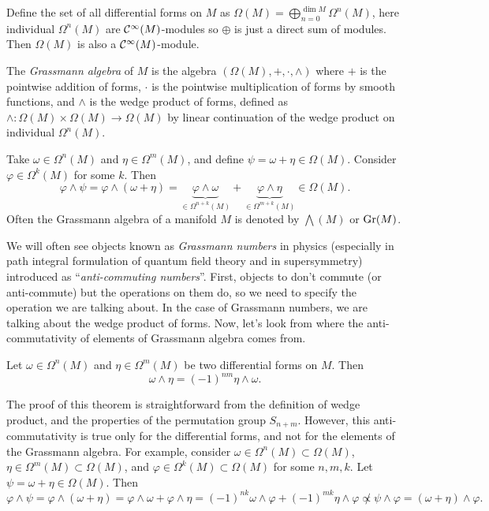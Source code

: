 Define the set of all differential forms on \(M\) as \(\Omega(M) = \bigoplus_{n=0}^{\dim M} \Omega^n(M)\), here individual \(\Omega^n(M)\) are \(\mathcal C^\infty(M)\)-modules so \(\oplus\) is just a direct sum of modules. Then \(\Omega(M)\) is also a \(\mathcal C^\infty(M)\)-module.
\begin{definition}
    The \emph{Grassmann algebra} of \(M\) is the algebra \((\Omega(M), +, \cdot, \wedge)\) where \(+\) is the pointwise addition of forms, \(\cdot\) is the pointwise multiplication of forms by smooth functions, and \(\wedge\) is the wedge product of forms, defined as \(\wedge: \Omega(M) \times \Omega(M) \to \Omega(M)\) by linear continuation of the wedge product on individual \(\Omega^n(M)\).
\end{definition}
Take \(\omega \in \Omega^n(M)\) and \(\eta \in \Omega^m(M)\), and define \(\psi = \omega + \eta \in \Omega(M)\). Consider \(\varphi \in \Omega^k(M)\) for some \(k\). Then
\begin{equation*}
    \varphi \wedge \psi = \varphi \wedge (\omega + \eta) = \underbrace{\varphi \wedge \omega}_{\in \Omega^{n+k}(M)} + \underbrace{\varphi \wedge \eta}_{\in \Omega^{m+k}(M)} \in \Omega(M).
\end{equation*}
Often the Grassmann algebra of a manifold \(M\) is denoted by \(\bigwedge(M)\) or \(\operatorname{Gr}(M)\).

We will often see objects known as \emph{Grassmann numbers} in physics (especially in path integral formulation of quantum field theory and in supersymmetry) introduced as ``\emph{anti-commuting numbers}''. First, objects to don't commute (or anti-commute) but the operations on them do, so we need to specify the operation we are talking about. In the case of Grassmann numbers, we are talking about the wedge product of forms. Now, let's look from where the anti-commutativity of elements of Grassmann algebra comes from.
\begin{theorem}
    Let \(\omega \in \Omega^n(M)\) and \(\eta \in \Omega^m(M)\) be two differential forms on \(M\). Then
    \begin{equation*}
        \omega \wedge \eta = (-1)^{n m} \eta \wedge \omega.
    \end{equation*}
\end{theorem}
The proof of this theorem is straightforward from the definition of wedge product, and the properties of the permutation group \(S_{n+m}\). However, this anti-commutativity is true only for the differential forms, and not for the elements of the Grassmann algebra. For example, consider \(\omega \in \Omega^n(M) \subset \Omega(M)\), \(\eta \in \Omega^m(M) \subset \Omega(M)\), and \(\varphi \in \Omega^k(M) \subset \Omega(M)\) for some \(n, m, k\). Let \(\psi = \omega + \eta \in \Omega(M)\). Then
\begin{equation*}
    \varphi \wedge \psi = \varphi \wedge (\omega + \eta) = \varphi \wedge \omega + \varphi \wedge \eta = (-1)^{n k} \omega \wedge \varphi + (-1)^{m k} \eta \wedge \varphi \not\propto \psi \wedge \varphi = (\omega + \eta) \wedge \varphi.
\end{equation*}


